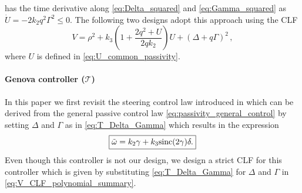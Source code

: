 \documentclass[journal,twoside,web]{ieeecolor}
\theoremstyle{definition}
\begin{document}
has the time derivative along \eqref{eq:Delta_squared} and \eqref{eq:Gamma_squared} as $\dot U =  - 2k_2q^2\Gamma^2 \le 0$.
The following two designs adopt this approach using the CLF
\begin{equation}
V = \rho^2 +k_3 \left(1+
\frac{2q^2+U}{2qk_2}\right)U
+ (\Delta+q\Gamma %
)^2\,,
\label{eq:V_CLF_polynomial_summary}
\end{equation}
where $U$ is defined in \eqref{eq:U_common_passivity}.
\paragraph{Genova controller ($\mathcal{T}$)} In this paper we first revisit the steering control law introduced in \cite{aicardi1995} which can be derived from the general passive control law  \eqref{eq:passivity_general_control} by setting $\Delta$ and $\Gamma$ as in \eqref{eq:T_Delta_Gamma} which results in the expression 
\begin{equation}
\fbox{$\tilde\omega =  k_2 \gamma + k_3 %
\mbox{sinc}(2\gamma)\delta.$} 
\label{eq:angular_velocity_genova}
\end{equation}
Even though this controller is not our design, we design a strict CLF for this controller which is given by substituting \eqref{eq:T_Delta_Gamma} for $\Delta$ and $\Gamma$ in \eqref{eq:V_CLF_polynomial_summary}. 
\end{document}
